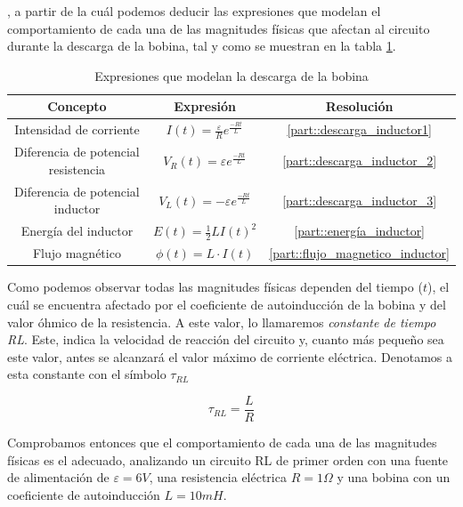 \documentclass[../main.tex]{subfiles}
\begin{document}
, a partir de la cuál podemos deducir las expresiones que modelan el comportamiento de cada una de las magnitudes físicas que afectan al circuito durante la descarga de la bobina, tal y como se muestran en la tabla \ref{tab::ecuaciones_descarga_rl}.\\

\begin{table}[!ht]
        \begin{center}
            \begin{tabular}{|| c | c | c ||}
                \hline
                \textbf{Concepto} & \textbf{Expresión} &  \textbf{Resolución}\\ \hline
                Intensidad de corriente & $I(t) = \frac{\varepsilon}{R}  e^{\frac{-Rt}{L}}$ & \ref{part::descarga_inductor1}\\
                Diferencia de potencial resistencia & $V_R(t) = \varepsilon  e^{\frac{-Rt}{L}}$ & \ref{part::descarga_inductor_2} \\ 
                Diferencia de potencial inductor & $V_L(t) = - \varepsilon   e^{\frac{-Rt}{L}}$ & \ref{part::descarga_inductor_3} \\ 
                Energía del inductor & $E(t) = \frac{1}{2}LI(t)^2 $ & \ref{part::energía_inductor} \\
                Flujo magnético & $\phi (t) = L \cdot I(t)$ & \ref{part::flujo_magnetico_inductor} \\
                \hline
                \end{tabular}
                \caption{Expresiones que modelan la descarga de la bobina}
                \label{tab::ecuaciones_descarga_rl}
        \end{center}
    \end{table}

Como podemos observar todas las magnitudes físicas dependen del tiempo ($t$), el cuál se encuentra afectado por el coeficiente de autoinducción de la bobina y del valor óhmico de la resistencia. A este valor, lo llamaremos \textit{constante de tiempo RL}. Este, indica la velocidad de reacción del circuito y, cuanto más pequeño sea este valor, antes se alcanzará el valor máximo de corriente eléctrica. Denotamos a esta constante con el símbolo $\tau_{RL}$

\begin{equation}
    \label{eqq::constante_tiempo_rl}
    \tau_{RL} = \frac{L}{R}
\end{equation}

Comprobamos entonces que el comportamiento de cada una de las magnitudes físicas es el adecuado, analizando un circuito RL de primer orden con una fuente de alimentación de $\varepsilon = 6V$, una resistencia eléctrica $R=1\Omega$ y una bobina con un coeficiente de autoinducción $L=10mH$. \\
\end{document}
